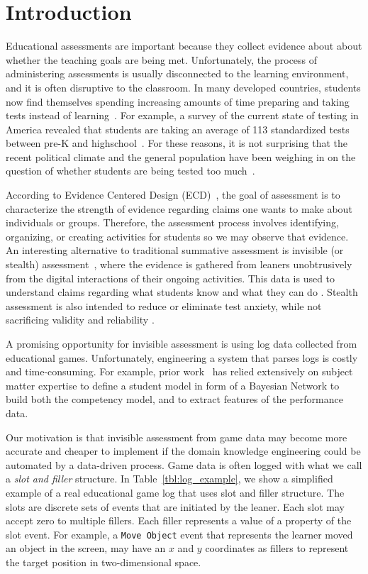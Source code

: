 \documentclass{sigchi}
\begin{document}
\section{Introduction}
Educational assessments are important because they collect evidence about about  whether  the teaching goals are being met.
Unfortunately, the process of  administering assessments is usually disconnected to the learning environment, and  it is often  disruptive to the classroom. 
In many developed countries, students now find themselves spending increasing amounts of time preparing and taking tests instead of learning~\cite{hofman2015rebalancing}.
For example, a  survey of the current state of testing in America revealed that students are taking an average of 113 standardized tests between pre-K and highschool~\cite{lazarin2014testing}. 
For these reasons, it is not surprising that the recent political climate and the general population have been weighing in on the question of whether students are being tested too much~\cite{lazarin2014testing}.


According to Evidence Centered Design (ECD)~\cite{mislevy2012design}, the goal of assessment is to characterize the strength of evidence regarding claims one wants to make about individuals or groups.
Therefore, the assessment process involves identifying, organizing, or creating activities for students so we may observe that evidence.
An interesting alternative to traditional summative assessment is invisible (or stealth) assessment~\cite{shute2013stealth},
where the evidence is gathered from leaners unobtrusively from the digital interactions of their ongoing activities.
This data is used  to understand claims regarding what students know and what they can do \cite{shute2009melding}.
Stealth assessment is also intended to reduce or eliminate test anxiety, while not sacrificing validity and reliability \cite{shute2008you}.



A promising opportunity for invisible assessment is using log data collected from educational games.
Unfortunately, engineering a system that parses logs is costly and time-consuming.
For example, prior work~\cite{shute2013stealth, shute2009melding} has relied extensively on subject matter expertise to define a student model in form of a  Bayesian Network to build both the competency model, and to extract features of the performance data.

Our motivation is that invisible assessment from game data may become more accurate and cheaper to implement if the domain knowledge engineering could be automated by a data-driven process.
Game data is often logged  with what we call a \textit{slot and filler} structure.
In Table~\ref{tbl:log_example}, we show a simplified example of a real educational game log that uses slot and filler structure.
The slots are discrete sets of events that are initiated by the leaner.
Each slot may accept zero to multiple fillers. 
Each filler represents a value of a property of the slot event.
For example, a \texttt{Move Object} event  that represents the learner moved an object in the screen, may have an $x$ and $y$ coordinates as fillers to represent the target position in two-dimensional space.
\end{document}
